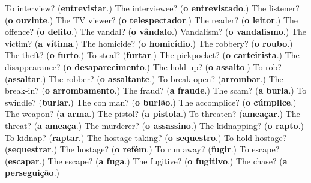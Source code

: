 \begin{tcolorbox}[breakable,colback=teal!4,colframe=teal!35!black,title={Before you move on}]
To interview? (\textbf{entrevistar}.) The interviewee? (\textbf{o entrevistado}.) The listener? (\textbf{o ouvinte}.) The TV viewer? (\textbf{o telespectador}.) The reader? (\textbf{o leitor}.) The offence? (\textbf{o delito}.) The vandal? (\textbf{o vândalo}.) Vandalism? (\textbf{o vandalismo}.) The victim? (\textbf{a vítima}.) The homicide? (\textbf{o homicídio}.) The robbery? (\textbf{o roubo}.) The theft? (\textbf{o furto}.) To steal? (\textbf{furtar}.) The pickpocket? (\textbf{o carteirista}.) The disappearance? (\textbf{o desaparecimento}.) The hold-up? (\textbf{o assalto}.) To rob? (\textbf{assaltar}.) The robber? (\textbf{o assaltante}.) To break open? (\textbf{arrombar}.) The break-in? (\textbf{o arrombamento}.) The fraud? (\textbf{a fraude}.) The scam? (\textbf{a burla}.) To swindle? (\textbf{burlar}.) The con man? (\textbf{o burlão}.) The accomplice? (\textbf{o cúmplice}.) The weapon? (\textbf{a arma}.) The pistol? (\textbf{a pistola}.) To threaten? (\textbf{ameaçar}.) The threat? (\textbf{a ameaça}.) The murderer? (\textbf{o assassino}.) The kidnapping? (\textbf{o rapto}.) To kidnap? (\textbf{raptar}.) The hostage-taking? (\textbf{o sequestro}.) To hold hostage? (\textbf{sequestrar}.) The hostage? (\textbf{o refém}.) To run away? (\textbf{fugir}.) To escape? (\textbf{escapar}.) The escape? (\textbf{a fuga}.) The fugitive? (\textbf{o fugitivo}.) The chase? (\textbf{a perseguição}.)
\end{tcolorbox}
